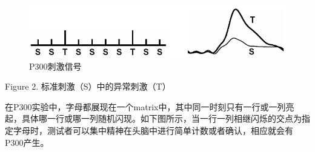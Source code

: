\begin{figure}[htb]
\centering
\includegraphics[scale=0.6]{Pictures/Chap1/p300_example.png}
\caption{P300刺激信号}
\label{Fig:P300_brief}
\end{figure}
Figure 2. 标准刺激（S）中的异常刺激（T）

在P300实验中，字母都展现在一个matrix中，其中同一时刻只有一行或一列亮起，具体哪一行或哪一列随机闪现。如下图所示，当一行一列相继闪烁的交点为指定字母时，测试者可以集中精神在头脑中进行简单计数或者确认，相应就会有P300产生。





